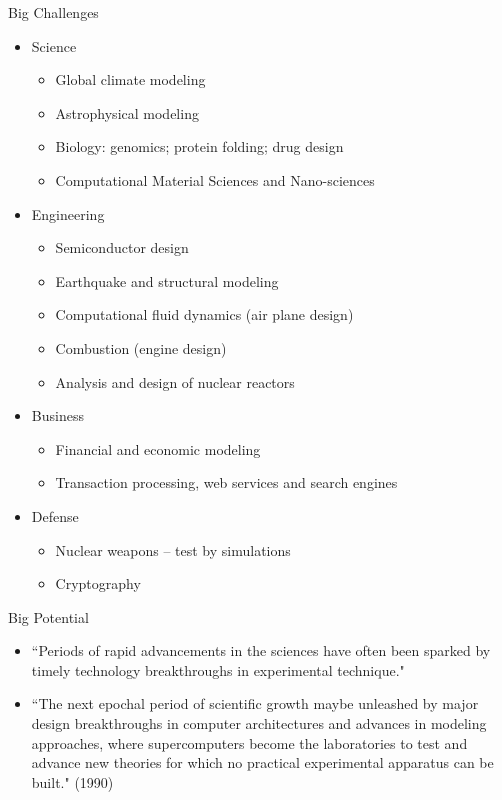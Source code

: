 \documentclass[xcolor=x11names,compress]{beamer}
\renewcommand{\(}{\begin{columns}}
\renewcommand{\)}{\end{columns}}
\newcommand{\<}[1]{\begin{column}{#1}}
\renewcommand{\>}{\end{column}}
\begin{document}
\begin{frame}{Big Challenges}
\begin{itemize}
\item Science
\begin{itemize}
\item Global climate modeling
\item Astrophysical modeling
\item Biology: genomics; protein folding; drug design
\item Computational Material Sciences and Nano-sciences
\end{itemize}
\item Engineering
\begin{itemize}
\item Semiconductor design
\item Earthquake and structural modeling
\item Computational fluid dynamics (air plane design)
\item Combustion (engine design)
\item Analysis and design of nuclear reactors
\end{itemize}
\item Business
\begin{itemize}
\item Financial and economic modeling
\item Transaction processing, web services and search engines
\end{itemize}
\item Defense
\begin{itemize}
\item Nuclear weapons -- test by simulations
\item Cryptography
\end{itemize}
\end{itemize}
\end{frame}

\begin{frame}{Big Potential}
\begin{itemize}
\item ``Periods of rapid advancements in the sciences have often been sparked by timely technology breakthroughs in experimental technique." 
\item ``The next epochal period of scientific growth maybe unleashed by major design breakthroughs in computer architectures and advances in modeling approaches, where supercomputers become the laboratories to test and advance new theories for which no practical experimental apparatus can be built." (1990)
\end{itemize}
\end{frame}
\end{document}
